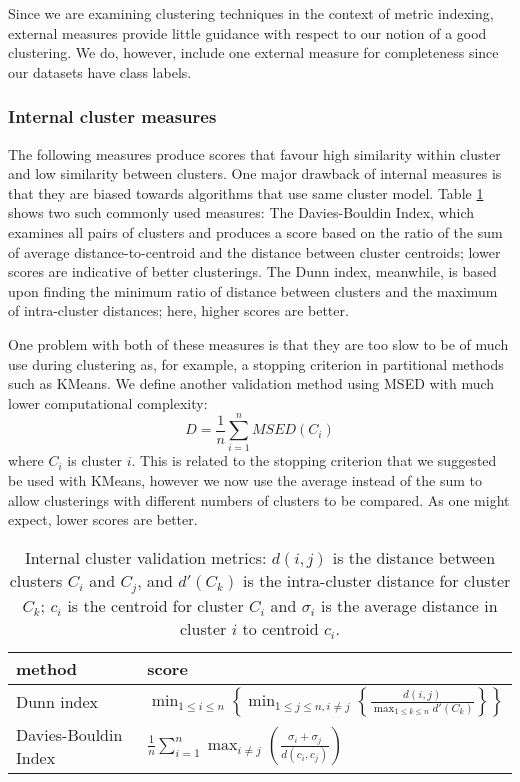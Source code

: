 Since we are examining clustering techniques in the context of metric indexing, external measures provide little guidance with respect to our notion of a good clustering.  We do, however, include one external measure for completeness since our datasets have class labels.
\subsubsection{Internal cluster measures}
The following measures produce scores that favour high similarity within cluster and low similarity between clusters. One major drawback of internal measures is that they are biased towards algorithms that use same cluster model.  Table \ref{tab:cluster_validation} shows two such commonly used measures: The Davies-Bouldin Index, which examines all pairs of clusters and produces a score based on the ratio of the sum of average distance-to-centroid and the distance between cluster centroids; lower scores are indicative of better clusterings.  The Dunn index, meanwhile, is based upon finding the minimum ratio of distance between clusters and the maximum of intra-cluster distances; here, higher scores are better.

One problem with both of these measures is that they are too slow to be of much use during clustering as, for example, a stopping criterion in partitional methods such as KMeans.  We define another validation method using MSED with much lower computational complexity:
\[
	D = \frac{1}{n} \sum_{i = 1}^n MSED(C_i)
\]
where $C_i$ is cluster $i$. This is related to the stopping criterion that we suggested be used with KMeans, however we now use the average instead of the sum to allow clusterings with different numbers of clusters to be compared.  As one might expect, lower scores are better.
\begin{table}
\caption{
Internal cluster validation metrics: $d(i, j)$ is the distance between clusters $C_i$ and $C_j$, and $d'(C_k)$ is the intra-cluster distance for cluster $C_k$; $c_i$ is the centroid for cluster $C_i$ and $\sigma_i$ is the average distance in cluster $i$ to centroid  $c_i$.
}\label{tab:cluster_validation}
\begin{tabularx}{\textwidth}{Xl}
\hline
method & score\\
\hline
Dunn index & $\min_{1 \leq i \leq n} \left\lbrace \min_{1 \leq j \leq n, i \neq j} \left\lbrace \frac{d(i, j)}{\max_{1 \leq k \leq n} d'(C_k)} \right\rbrace \right\rbrace$\\
Davies-Bouldin Index & $\frac{1}{n} \sum_{i = 1}^n \max_{i \neq j} \left( \frac{\sigma_i + \sigma_j}{d(c_i, c_j)} \right)$\\
\hline
\end{tabularx}
\end{table}
